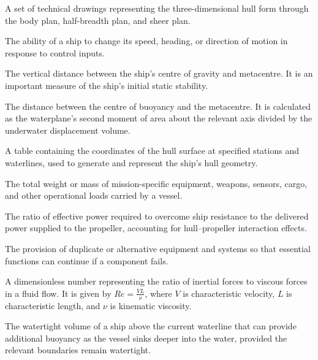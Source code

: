 \begin{appendices}
\begin{description}[
    leftmargin=4.3cm,
    labelwidth=3.8cm,
    labelsep=0.25cm,
    align=left,
    style=multiline,
    itemsep=0.65em,
    parsep=0pt,
    font=\normalfont\bfseries
]
\item[Lines Plan]
A set of technical drawings representing the three-dimensional hull form through the body plan, half-breadth plan, and sheer plan.

\item[Maneuverability]
The ability of a ship to change its speed, heading, or direction of motion in response to control inputs.

\item[Metacentric Height ($GM$)]
The vertical distance between the ship's centre of gravity and metacentre. It is an important measure of the ship's initial static stability.

\item[Metacentric Radius ($BM$)]
The distance between the centre of buoyancy and the metacentre. It is calculated as the waterplane's second moment of area about the relevant axis divided by the underwater displacement volume.

\item[Offset Table]
A table containing the coordinates of the hull surface at specified stations and waterlines, used to generate and represent the ship's hull geometry.

\item[Payload]
The total weight or mass of mission-specific equipment, weapons, sensors, cargo, and other operational loads carried by a vessel.

\item[Quasi-Propulsive Coefficient (QPC)]
The ratio of effective power required to overcome ship resistance to the delivered power supplied to the propeller, accounting for hull--propeller interaction effects.

\item[Redundancy]
The provision of duplicate or alternative equipment and systems so that essential functions can continue if a component fails.

\item[Reynolds Number ($Re$)]
A dimensionless number representing the ratio of inertial forces to viscous forces in a fluid flow. It is given by
$Re = \frac{VL}{\nu}$, where $V$ is characteristic velocity, $L$ is characteristic length, and $\nu$ is kinematic viscosity.

\item[Reserve Buoyancy]
The watertight volume of a ship above the current waterline that can provide additional buoyancy as the vessel sinks deeper into the water, provided the relevant boundaries remain watertight.


\end{description}
\end{appendices}
